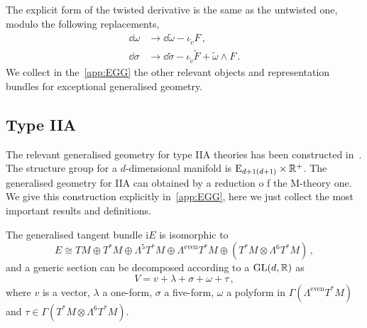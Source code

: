 \documentclass[debug]{phd}
\begin{document}
						The explicit form of the twisted derivative is the same as the untwisted one, modulo the following replacements,
								\begin{equation}\label{repruleTwDorf}
									\begin{split}
										\dd \omega	&\rightarrow 	\dd \tilde{\omega} -\iota_{\tilde{v}} F \, , \\
										\dd\sigma 		&\rightarrow	\dd \tilde{\sigma} - \iota_{\tilde{v}} \tilde{F} + \tilde{\omega}\wedge F \, .
									\end{split}
								\end{equation}
						We collect in the~\cref{app:EGG} the other relevant objects and representation bundles for exceptional generalised geometry.
			\subsection{Type IIA}\label{sec:EGGIIA}
				The relevant generalised geometry for type IIA theories has been constructed in~\cite{oscar1}.
				The structure group for a $d$-dimensional manifold is $\mathrm{E}_{d+1(d+1)} \times \mathbb{R}^+$. The generalised geometry for IIA can obtained by a reduction o
				f the M-theory one. 
				We give this construction explicitly in~\cref{app:EGG}, here we just collect the most important results and definitions.
									
				
				The generalised tangent bundle i$E$ is isomorphic to
							\begin{equation}\label{IIAtangbung}
								E \cong TM \oplus T^*M \oplus \Lambda^5 T^*M \oplus \Lambda^{\mathrm{even}} T^*M \oplus (T^*M \otimes \Lambda^6 T^*M)\, ,
							\end{equation}
and a generic section can be decomposed according to a $\mathrm{GL}(d,\mathbb{R})$ as 
							\begin{equation}\label{IIAgenV}
								V = v + \lambda + \sigma + \omega + \tau \, ,
							\end{equation}
where $v$ is a vector, $\lambda$ a one-form, $\sigma$ a five-form, $\omega$ a polyform in $\Gamma(\Lambda^{\mathrm{even}}T^*M)$ and $\tau \in \Gamma(T^*M \otimes \Lambda^6 T^*M)$.
\end{document}
